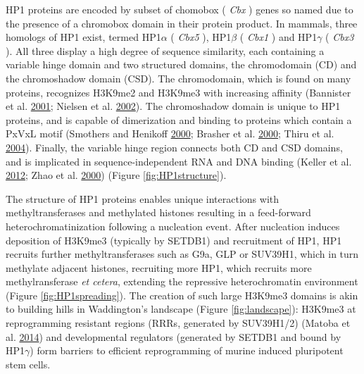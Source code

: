 \documentclass[onehalf,12pt]{beavtex}
\begin{document}
  HP1 proteins are encoded by subset of chomobox ( \emph{Cbx} ) genes so
  named due to the presence of a chromobox domain in their protein
  product. In mammals, three homologs of HP1 exist, termed HP1\(\alpha\) (
  \emph{Cbx5} ), HP1\(\beta\) ( \emph{Cbx1} ) and HP1\(\gamma\) (
  \emph{Cbx3} ). All three display a high degree of sequence similarity,
  each containing a variable hinge domain and two structured domains, the
  chromodomain (CD) and the chromoshadow domain (CSD). The chromodomain,
  which is found on many proteins, recognizes H3K9me2 and H3K9me3 with
  increasing affinity (Bannister et al.
  \protect\hyperlink{ref-BannisterSelectiverecognitionmethylated2001}{2001};
  Nielsen et al.
  \protect\hyperlink{ref-NielsenStructureHP1chromodomain2002}{2002}). The
  chromoshadow domain is unique to HP1 proteins, and is capable of
  dimerization and binding to proteins which contain a PxVxL motif
  (Smothers and Henikoff
  \protect\hyperlink{ref-SmothersHP1chromoshadow2000}{2000}; Brasher et
  al. \protect\hyperlink{ref-BrasherstructuremouseHP12000}{2000}; Thiru et
  al. \protect\hyperlink{ref-ThiruStructuralbasisHP12004}{2004}). Finally,
  the variable hinge region connects both CD and CSD domains, and is
  implicated in sequence-independent RNA and DNA binding (Keller et al.
  \protect\hyperlink{ref-KellerHP1Swi6mediates2012}{2012}; Zhao et al.
  \protect\hyperlink{ref-ZhaoHeterochromatinproteinbinds2000}{2000})
  (Figure \ref{fig:HP1structure}).
  
  The structure of HP1 proteins enables unique interactions with
  methyltransferases and methylated histones resulting in a feed-forward
  heterochromatinization following a nucleation event. After nucleation
  induces deposition of H3K9me3 (typically by SETDB1) and recruitment of
  HP1, HP1 recruits further methyltransferases such as G9a, GLP or
  SUV39H1, which in turn methylate adjacent histones, recruiting more HP1,
  which recruits more methylransferase \emph{et cetera}, extending the
  repressive heterochromatin environment (Figure \ref{fig:HP1spreading}).
  The creation of such large H3K9me3 domains is akin to building hills in
  Waddington's landscape (Figure \ref{fig:landscape}): H3K9me3 at
  reprogramming resistant regions (RRRs, generated by SUV39H1/2) (Matoba
  et al.
  \protect\hyperlink{ref-MatobaEmbryonicDevelopmentfollowing2014}{2014})
  and developmental regulators (generated by SETDB1 and bound by
  HP1\(\gamma\)) form barriers to efficient reprogramming of murine
  induced pluripotent stem cells.
  
\end{document}
